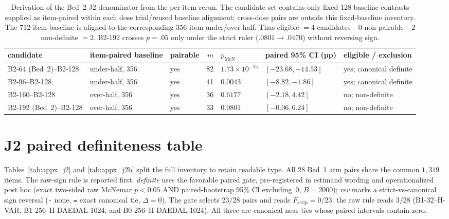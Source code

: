 \documentclass{article}
\begin{document}
\begin{table}[H]
\centering\footnotesize
\setlength{\tabcolsep}{2pt}
\begin{tabular}{@{}>{\raggedright\arraybackslash}p{1.85cm}
                    >{\raggedright\arraybackslash}p{2.0cm}
                    >{\centering\arraybackslash}p{1.2cm}
                    r
                    >{\centering\arraybackslash}p{1.15cm}
                    >{\raggedright\arraybackslash}p{2.4cm}
                    >{\raggedright\arraybackslash}p{3.5cm}@{}}
\toprule
candidate & item-paired baseline & pairable & $m$ & $p_{\mathrm{McN}}$ & paired 95\% CI (pp) & eligible / exclusion \\
\midrule
\textsc{B2-64} (Bed~2)--\textsc{B2-128}  & under-half, 356 & yes & 82 & $1.73\!\times\!10^{-15}$ & $[-23.68,-14.53]$ & yes; canonical definite \\
\textsc{B2-96}--\textsc{B2-128}  & under-half, 356 & yes & 41 & $0.0043$ & $[-8.82,-1.86]$ & yes; canonical definite \\
\textsc{B2-160}--\textsc{B2-128} & over-half, 356  & yes & 36 & $0.6177$ & $[-2.18,4.42]$ & no; non-definite \\
\textsc{B2-192} (Bed~2)--\textsc{B2-128} & over-half, 356  & yes & 33 & $0.0801$ & $[-0.06,6.24]$ & no; non-definite \\
\bottomrule
\end{tabular}
\caption{Derivation of the Bed~2 J2 denominator from the per-item rerun.  The
candidate set contains only fixed-128 baseline contrasts supplied as
item-paired within each dose trial/reused baseline alignment; cross-dose pairs
are outside this fixed-baseline inventory.  The 712-item baseline is aligned
to the corresponding 356-item under/over half.  Thus eligible $=4$ candidates
$-0$ non-pairable $-2$ non-definite $=2$.  \textsc{B2-192} crosses
$p=.05$ only under the strict ruler ($.0801\to.0470$) without reversing sign.}
\label{tab:bed2-j2}
\end{table}

\section{J2 paired definiteness table}\label{sec:appx_j2tab}

Tables~\ref{tab:appx_j2} and \ref{tab:appx_j2b} split the full inventory to
retain readable type.
All $28$ Bed~1 arm pairs share the common $1{,}319$ items.  The raw-sign rule
is reported first.  \emph{definite} uses the favorable paired gate,
pre-registered in estimand wording and operationalized post hoc (exact
two-sided raw McNemar $p<0.05$ AND
paired-bootstrap 95\% CI excluding~0, $B{=}2000$); \emph{rev} marks a
strict-vs-canonical sign reversal (\texttt{-} none, \texttt{=} exact canonical
tie, $\Delta{=}0$).  The gate selects 23/28 pairs and reads
$F_{\mathrm{strip}}=0/23$; the raw rule reads $3/28$
(\textsc{B1-32}--\textsc{H-VAR}, \textsc{B1-256}--\textsc{H-DAEDAL-1024}, and
\textsc{B0-256}--\textsc{H-DAEDAL-1024}).  All three are canonical near-ties whose
paired intervals contain zero.
\end{document}
